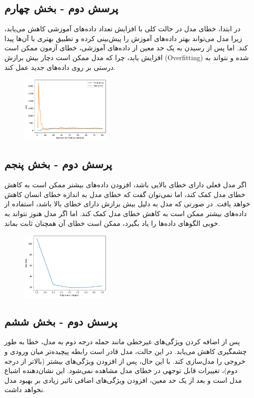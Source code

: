 \documentclass{article}
\begin{document}
\subsection{پرسش دوم - بخش چهارم}
در ابتدا، خطای مدل در حالت کلی با افزایش تعداد داده‌های آموزشی کاهش می‌یابد، زیرا مدل می‌تواند بهتر داده‌های آموزش را پیش‌بینی کرده و تطبیق بهتری با آن‌ها پیدا کند. اما پس از رسیدن به یک حد معین از داده‌های آموزشی، خطای آزمون ممکن است افزایش یابد، چرا که مدل ممکن است دچار بیش برازش (Overfitting) شده و نتواند به درستی بر روی داده‌های جدید عمل کند.

\begin{figure}[!h]
    \centering
    \includegraphics[width=0.4\textwidth]{img/6.png}
\end{figure}

\subsection{پرسش دوم - بخش پنجم}
اگر مدل فعلی دارای خطای بالایی باشد، افزودن داده‌های بیشتر ممکن است به کاهش خطای مدل کمک کند، اما نمی‌توان گفت که خطای مدل به اندازه خطای انسان کاهش خواهد یافت. در صورتی که مدل به دلیل بیش برازش دارای خطای بالا باشد، استفاده از داده‌های بیشتر ممکن است به کاهش خطای مدل کمک کند. اما اگر مدل هنوز نتواند به خوبی الگوهای داده‌ها را یاد بگیرد، ممکن است خطای آن همچنان ثابت بماند.

\begin{figure}[!h]
    \centering
    \includegraphics[width=0.4\textwidth]{img/7.png}
\end{figure}

\subsection{پرسش دوم - بخش ششم}
پس از اضافه کردن ویژگی‌های غیرخطی مانند جمله درجه دوم به مدل، خطا به طور چشمگیری کاهش می‌یابد. در این حالت، مدل قادر است رابطه پیچیده‌تر میان ورودی و خروجی را مدل‌سازی کند. با این حال، پس از افزودن ویژگی‌های بیشتر (بالا‌تر از درجه دوم)، تغییرات قابل توجهی در خطای مدل مشاهده نمی‌شود. این نشان‌دهنده اشباع مدل است و بعد از یک حد معین، افزودن ویژگی‌های اضافی تاثیر زیادی بر بهبود مدل نخواهد داشت.
\end{document}
